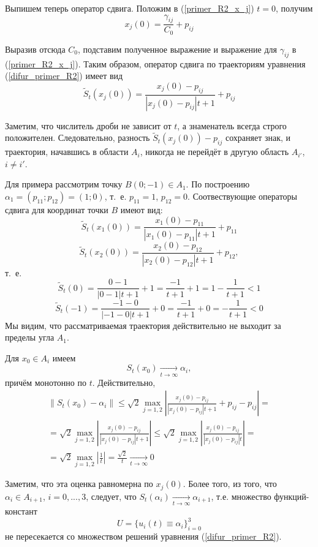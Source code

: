 Выпишем теперь оператор сдвига.
Положим в (\ref{primer_R2_x_j}) $t=0$, получим
$$
	x_j(0) = \frac{\gamma_{ij}}{C_0}+p_{ij}
$$

Выразив отсюда $C_0$, подставим полученное выражение и выражение для $\gamma_{ij}$ в (\ref{primer_R2_x_j}).
Таким образом, оператор сдвига по траекториям уравнения (\ref{difur_primer_R2}) имеет вид
\begin{equation}\label{primer_R2_oper_sdviga}
	\tilde{S}_t(x_{j}(0)) = \frac{x_{j}(0)-p_{ij}}{|x_{j}(0)-p_{ij}|t+1}+p_{ij}
\end{equation}

Заметим, что числитель дроби не зависит от $t$, а знаменатель всегда строго положителен.
Следовательно, разность $\tilde{S}_t(x_j(0)) - p_{ij}$ сохраняет знак,
и траектория, начавшись в области $A_i$, никогда не перейдёт в другую область $A_{i'}$, $i \neq i'$.

Для примера рассмотрим точку $B(0; -1) \in A_1$.
По построению $\alpha_1 = (p_{11}; p_{12}) = (1; 0)$, т.~е. $p_{11} = 1$, $p_{12} = 0$.
Соотвествующие операторы сдвига для координат точки $B$ имеют вид:
$$
	\tilde{S}_t(x_{1}(0))
	= \frac{x_{1}(0)-p_{11}}{|x_{1}(0)-p_{11}|t+1}+p_{11}
$$
$$
	\tilde{S}_t(x_{2}(0))
	= \frac{x_{2}(0)-p_{12}}{|x_{2}(0)-p_{12}|t+1}+p_{12},
$$
т.~е.
$$
	\tilde{S}_t(0)
	= \frac{0-1}{|0-1|t+1}+1
	= \frac{-1}{t+1}+1
	= 1 - \frac{1}{t+1}
	< 1
$$
$$
	\tilde{S}_t(-1)
	= \frac{-1-0}{|-1-0|t+1}+0
	= \frac{-1}{t+1}+0
	= -\frac{1}{t+1}
	< 0
$$
Мы видим, что рассматриваемая траектория действительно не выходит за пределы угла $A_1$.


Для $x_0 \in A_i$ имеем
\begin{equation}\label{primer_R2_stremlenie}
	S_t(x_0) \xrightarrow[t \to \infty]{} \alpha_{i},
\end{equation}
причём монотонно по $t$.
Действительно,
\begin{multline}
	\|S_t(x_0) - \alpha_i\| \leq
	\sqrt{2} \max_{j=1,2} \left| \frac{x_{j}(0)-p_{ij}}{|x_{j}(0)-p_{ij}|t+1} + p_{ij} - p_{ij}  \right| = \\ =
	\sqrt{2} \max_{j=1,2} \left| \frac{x_{j}(0)-p_{ij}}{|x_{j}(0)-p_{ij}|t+1} \right| \leq
	\sqrt{2} \max_{j=1,2} \left| \frac{x_{j}(0)-p_{ij}}{|x_{j}(0)-p_{ij}|t} \right| =
	\\ =
	\sqrt{2} \max_{j=1,2} \left| \frac{1}{t} \right| =
	\frac{\sqrt{2}}{t} \xrightarrow[t \to \infty]{} 0
\end{multline}

Заметим, что эта оценка равномерна по $x_{j}(0)$.
Более того, из того, что $\alpha_i \in A_{i+1}$, $i=0,...,3$,
следует, что $S_t(\alpha_i) \xrightarrow[t \to \infty]{} \alpha_{i+1}$,
т.е. множество функций-констант
$$
	U = \{ u_i(t) \equiv \alpha_i \}_{i=0}^{3}
$$
не пересекается со множеством решений уравнения (\ref{difur_primer_R2}).

